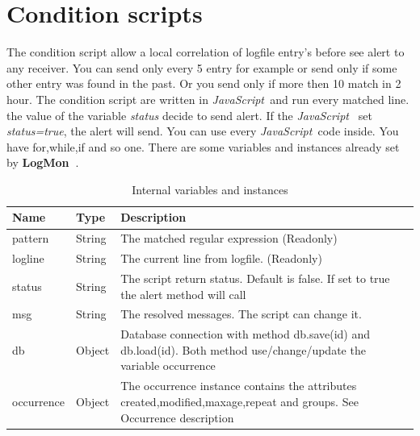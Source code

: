 \documentclass[11pt,a4paper]{article}
\newcommand{\logmon}{\textbf{LogMon\ }}
\newcommand{\js}{\textit{JavaScript\ }}
\begin{document}
\section{Condition scripts}
\label{sec:conditions}

The condition script allow a local correlation of logfile entry's before
see alert to any receiver. You can send only every 5 entry for example or send only
if some other entry was found in the past. Or you send only if more then 10 match
in 2 hour. The condition script are written in \js and run every matched line.
the value of the variable \textit{status} decide to send alert. If the \js
set \textit{status=true}, the alert will send. You can use every \js code
inside. You have for,while,if and so one. There are some variables and instances
already set by \logmon.

\begin{table}[ht]
\begin{tabular}{l|l|p{}}

  Name & Type & Description\\\hline\hline

  pattern & String &
  The matched regular expression (Readonly) \\\hline

  logline & String &
  The current line from logfile. (Readonly)\\\hline

  status & String &
  The script return status. Default is false. If set to true
  the alert method will call\\\hline

  msg & 	String &
  The resolved messages. The script can change it.\\\hline

  db & Object &
  Database connection with method db.save(id) and db.load(id).
  Both method use/change/update the  variable occurrence\\\hline

  occurrence & 	Object &
  The occurrence instance contains the attributes
  created,modified,maxage,repeat and groups. See Occurrence description\\\hline

\end{tabular}
\label{tab:vars}
\caption{Internal variables and instances}
\end{table}
\end{document}
